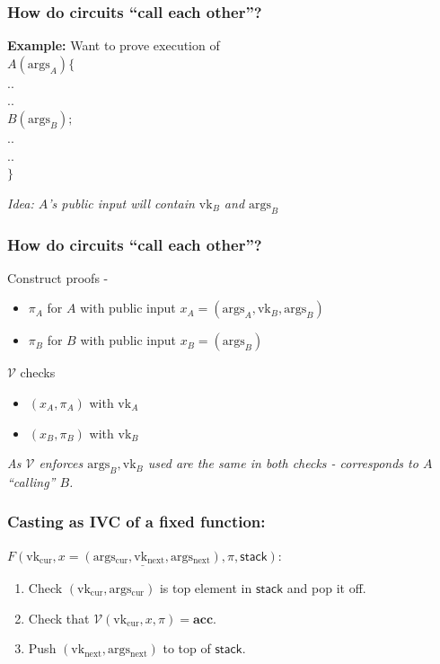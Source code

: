 \documentclass[shadesubsections,compress,14pt,mathserif]{beamer}
\newcommand{\ver}{\ensuremath{\mathcal{V}}}
\newcommand{\acc}{{\mathbf{acc}}}
\newcommand{\nl}{\\ \pause \vspace{0.2in}}
\newcommand{\nlnp}{\\ \vspace{0.2in}}
\newcommand{\vk}{\ensuremath{\mathrm{vk} }}
\newcommand{\vknext}{\ensuremath{\mathrm{vk_{next}} }}
\newcommand{\vkcur}{\ensuremath{\mathrm{vk_{cur}} }}
\newcommand{\args}{\ensuremath{\mathrm{args} }}
\newcommand{\stack}{\ensuremath{\mathsf{stack} }}
\newcommand{\argscur}{\ensuremath{\mathrm{args_{cur}} }}
\newcommand{\argsnext}{\ensuremath{\mathrm{args_{next}} }}
\begin{document}
\begin{frame}
\frametitle{How do circuits  ``call each other''?}\pause
\textbf{Example:} Want to prove execution of\nlnp
$A(\args_A)\{$\\
\;\;\;\;..\\
\;\;\;\;..\\
\;\;\;\;$B(\args_B);$\\
\;\;\;\;..\\
\;\;\;\;..\\
$\}$\pause

\textit{Idea: $A$'s public input will contain $\vk_B$ and $\args_B$}

\end{frame}
\begin{frame}
\frametitle{How do circuits  ``call each other''?}
Construct proofs - 
\begin{itemize}
\item$\pi_A$ for $A$ with public input $x_A=(\args_A,\vk_B,\args_B)$\pause
\item$\pi_B$ for $B$ with public input $x_B=(\args_B)$\nl
 \end{itemize}
  
  $\ver$ checks 
  \begin{itemize}
   \item 
$(x_A,\pi_A)$ with $\vk_A$\\
       \item     $(x_B,\pi_B)$ with $\vk_B$\nl
  \end{itemize}
  \emph{As $\ver$ enforces $\args_B,\vk_B$ used are \emph{the same} in both checks - corresponds to $A$ ``calling'' $B$. }
\end{frame}
 
\begin{frame}
 \frametitle{Casting as IVC of a fixed function:}
 $\underline{F(\vkcur,x=(\argscur,\vknext,\argsnext),\pi,\stack)}:$\pause
 \begin{enumerate}
  \item Check $(\vkcur,\argscur)$ is top element in $\stack$ and pop it off.\pause
  \item Check that $\ver(\vkcur,x,\pi)=\acc$.\pause
  \item Push $(\vknext,\argsnext)$ to top of \stack.
 \end{enumerate}

\end{frame}
 
\end{document}

